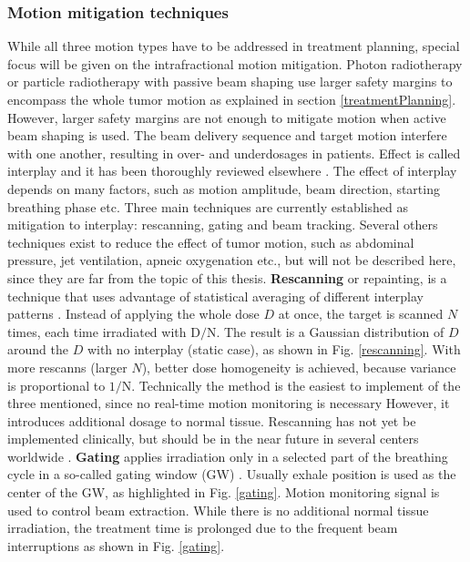 \documentclass[type=dr, dr=rernat, accentcolor=tud7b,colorbacktitle, bigchapter, openright, twoside, 12pt ]{tudthesis}
\begin{document}
\subsubsection{Motion mitigation techniques}


While all three motion types have to be addressed in treatment planning, special focus will be given on the intrafractional motion mitigation. Photon radiotherapy or particle radiotherapy with passive beam shaping 
use larger safety margins to encompass the whole tumor motion as explained in section \ref{treatmentPlanning}. However, larger safety margins are not enough to mitigate motion when active beam shaping is used. The beam delivery 
sequence and target motion interfere with one another, resulting in over- and underdosages in patients. Effect is called interplay and it has been thoroughly reviewed elsewhere \cite{Phillips1992,Bert2008}. The effect of interplay depends
on many factors, such as motion amplitude, beam direction, starting breathing phase etc. Three main techniques are currently established as mitigation to interplay: rescanning, gating and beam tracking. Several others techniques exist
to reduce the effect of tumor motion, such as abdominal pressure, jet ventilation, apneic oxygenation etc., but will not be described here, since they are far from the topic of this thesis.
\newline
\textbf{Rescanning} or repainting, is a technique that uses advantage of statistical averaging of different interplay patterns \cite{Phillips1992}. Instead of applying the whole dose $D$ at once, the target is scanned $N$ times, each
time irradiated with $\mathrm{D}/\mathrm{N}$. The result is a Gaussian distribution of $D$ around the $D$ with no interplay (static case), as shown in Fig. \ref{rescanning}. With more rescanns (larger $N$), better dose homogeneity is achieved, because variance is proportional
to $\mathrm{1}/\mathrm{N}$. Technically the method is the easiest to implement of the three mentioned, since no real-time motion monitoring is necessary However, it introduces additional dosage to normal tissue. Rescanning has not yet be
implemented clinically, but should be in the near future in several centers worldwide \cite{Furukawa2007, Zenklusen2010}.
\newline
\textbf{Gating} applies irradiation only in a selected part of the breathing cycle in a so-called gating window (GW) \cite{Minohara2000,Lu2006}. Usually exhale position is used as the center of the GW, as highlighted in Fig. \ref{gating}.
Motion monitoring signal is used to control beam extraction. While there is no additional normal tissue irradiation, the treatment time is prolonged due to the frequent beam interruptions as shown in Fig. \ref{gating}.
\end{document}
